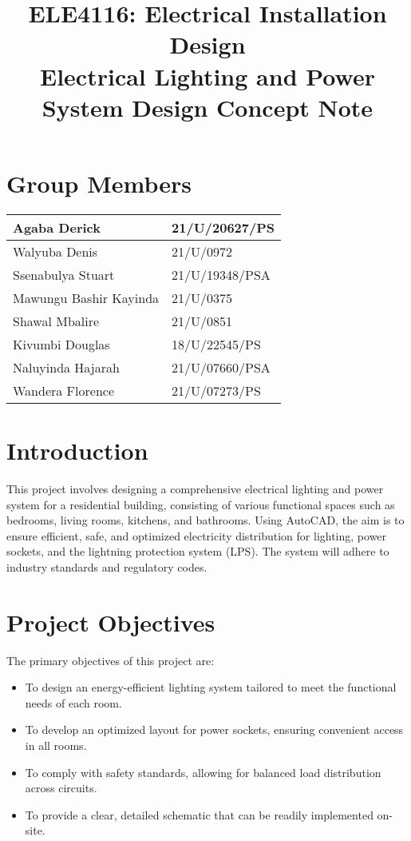 \documentclass[a4paper,12pt]{article}
\title{\Large ELE4116: Electrical Installation Design\\[0.5cm]
\textbf{\Huge Electrical Lighting and Power System Design Concept Note}}
\author{}
\date{}
\begin{document}
\maketitle

\section*{Group Members}
\begin{table}[htbp]
    \centering
    \begin{tabular}{|l|l|} 
        \hline
        Agaba Derick & 21/U/20627/PS \\
        \hline
        Walyuba Denis & 21/U/0972 \\
        \hline
        Ssenabulya Stuart & 21/U/19348/PSA \\
        \hline
        Mawungu Bashir Kayinda & 21/U/0375 \\
        \hline
        Shawal Mbalire & 21/U/0851 \\
        \hline
        Kivumbi Douglas & 18/U/22545/PS \\
        \hline
        Naluyinda Hajarah & 21/U/07660/PSA \\
        \hline
        Wandera Florence & 21/U/07273/PS \\
        \hline
    \end{tabular}
    \label{<label>}
\end{table}

\section{Introduction}
This project involves designing a comprehensive electrical lighting and power system for a residential building, consisting of various functional spaces such as bedrooms, living rooms, kitchens, and bathrooms. Using AutoCAD, the aim is to ensure efficient, safe, and optimized electricity distribution for lighting, power sockets, and the lightning protection system (LPS). The system will adhere to industry standards and regulatory codes.

\section{Project Objectives}
The primary objectives of this project are:
\begin{itemize}
    \item To design an energy-efficient lighting system tailored to meet the functional needs of each room.
    \item To develop an optimized layout for power sockets, ensuring convenient access in all rooms.
    \item To comply with safety standards, allowing for balanced load distribution across circuits.
    \item To provide a clear, detailed schematic that can be readily implemented on-site.
\end{itemize}
\end{document}
